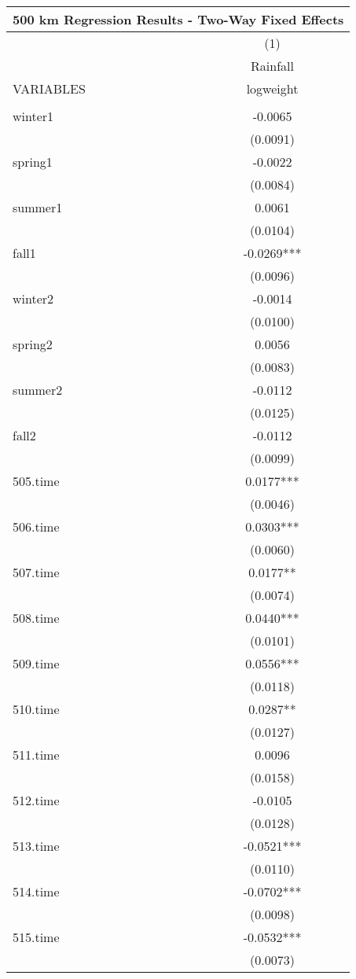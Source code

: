 \documentclass[]{article}
\begin{document}
\begin{tabular}{lc}
\multicolumn{2}{c}{\huge 500 km Regression Results - Two-Way Fixed Effects} \\ \hline
 & (1) \\
 & \Large Rainfall \\
VARIABLES & logweight \\ \hline
 &  \\
winter1 & -0.0065 \\
 & (0.0091) \\
spring1 & -0.0022 \\
 & (0.0084) \\
summer1 & 0.0061 \\
 & (0.0104) \\
fall1 & -0.0269*** \\
 & (0.0096) \\
winter2 & -0.0014 \\
 & (0.0100) \\
spring2 & 0.0056 \\
 & (0.0083) \\
summer2 & -0.0112 \\
 & (0.0125) \\
fall2 & -0.0112 \\
 & (0.0099) \\
505.time & 0.0177*** \\
 & (0.0046) \\
506.time & 0.0303*** \\
 & (0.0060) \\
507.time & 0.0177** \\
 & (0.0074) \\
508.time & 0.0440*** \\
 & (0.0101) \\
509.time & 0.0556*** \\
 & (0.0118) \\
510.time & 0.0287** \\
 & (0.0127) \\
511.time & 0.0096 \\
 & (0.0158) \\
512.time & -0.0105 \\
 & (0.0128) \\
513.time & -0.0521*** \\
 & (0.0110) \\
514.time & -0.0702*** \\
 & (0.0098) \\
515.time & -0.0532*** \\
 & (0.0073) \\

\end{tabular}
\end{document}
